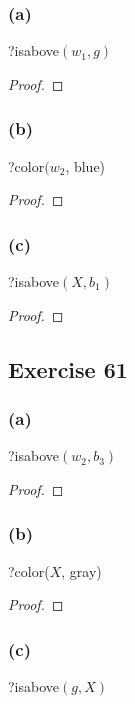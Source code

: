 \documentclass[14pt]{extarticle}
\begin{document}
\subsubsection{(a)}
?isabove$(w_1, g)$

\begin{proof}

\end{proof}

\subsubsection{(b)}
?color$(w_2$, blue)

\begin{proof}

\end{proof}

\subsubsection{(c)}
?isabove$(X, b_1)$

\begin{proof}

\end{proof}

\subsection{Exercise 61}

\subsubsection{(a)}
?isabove$(w_2, b_3)$

\begin{proof}

\end{proof}

\subsubsection{(b)}
?color($X$, gray)

\begin{proof}

\end{proof}

\subsubsection{(c)}
?isabove$(g, X)$
\end{document}
